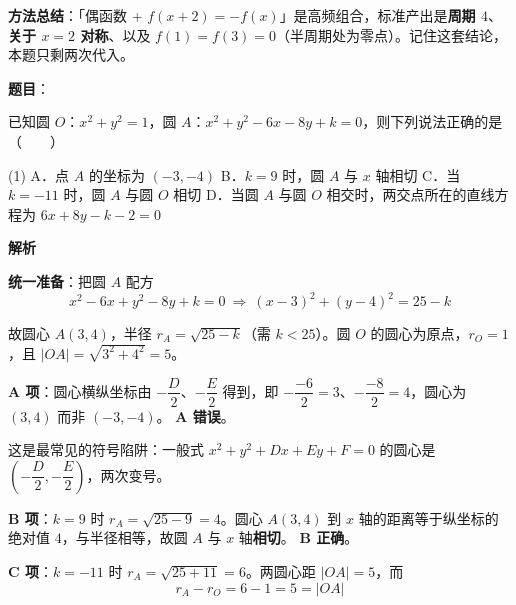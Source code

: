 \begin{answer}
\begin{gktip}
\textbf{方法总结}：「偶函数 + $f(x+2)=-f(x)$」是高频组合，标准产出是\textbf{周期 $4$}、\textbf{关于 $x=2$ 对称}、以及 $f(1)=f(3)=0$（半周期处为零点）。记住这套结论，本题只剩两次代入。
\end{gktip}


\par\medskip

\end{answer}

\begin{answer}

\textbf{题目}：

已知圆 $O$：$x^2+y^2=1$，圆 $A$：$x^2+y^2-6x-8y+k=0$，则下列说法正确的是\mbox{（　　）}

\begin{gkopts}(1)
\task A．点 $A$ 的坐标为 $(-3,-4)$
\task B．$k=9$ 时，圆 $A$ 与 $x$ 轴相切
\task C．当 $k=-11$ 时，圆 $A$ 与圆 $O$ 相切
\task D．当圆 $A$ 与圆 $O$ 相交时，两交点所在的直线方程为 $6x+8y-k-2=0$
\end{gkopts}

\textbf{解析}

\textbf{统一准备}：把圆 $A$ 配方
\nopagebreak[4]
\[x^2-6x+y^2-8y+k=0\ \Longrightarrow\ (x-3)^2+(y-4)^2=25-k\]

故圆心 $A(3,4)$，半径 $r_A=\sqrt{25-k}$（需 $k<25$）。圆 $O$ 的圆心为原点，$r_O=1$，且 $\left|OA\right|=\sqrt{3^2+4^2}=5$。

\par\medskip

\textbf{A 项}：圆心横纵坐标由 $-\dfrac{D}{2}$、$-\dfrac{E}{2}$ 得到，即 $-\dfrac{-6}{2}=3$、$-\dfrac{-8}{2}=4$，圆心为 $(3,4)$ 而非 $(-3,-4)$。 \textbf{A 错误}。

\begin{gktip}
这是最常见的符号陷阱：一般式 $x^2+y^2+Dx+Ey+F=0$ 的圆心是 $\left(-\dfrac{D}{2},-\dfrac{E}{2}\right)$，两次变号。
\end{gktip}

\par\medskip

\textbf{B 项}：$k=9$ 时 $r_A=\sqrt{25-9}=4$。圆心 $A(3,4)$ 到 $x$ 轴的距离等于纵坐标的绝对值 $4$，与半径相等，故圆 $A$ 与 $x$ 轴\textbf{相切}。 \textbf{B 正确}。

\par\medskip

\textbf{C 项}：$k=-11$ 时 $r_A=\sqrt{25+11}=6$。两圆心距 $\left|OA\right|=5$，而
\nopagebreak[4]
\[r_A-r_O=6-1=5=\left|OA\right|\]


\end{answer}
